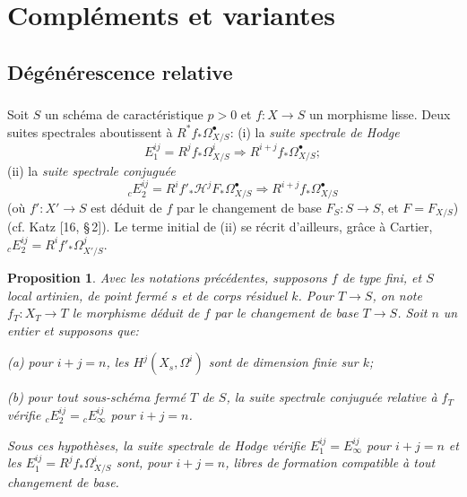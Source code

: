 \documentclass[12pt,a4paper]{article}
\theoremstyle{plain}
\newtheorem{proposition}[theorem]{Proposition}
\theoremstyle{definition}
\theoremstyle{remark}
\begin{document}
\section{Compl\'ements et variantes}

\subsection{D\'eg\'en\'erescence relative}

\subsubsection{}

Soit $S$ un sch\'ema de caract\'eristique $p > 0$ et $f: X \to S$ un morphisme lisse. Deux suites spectrales aboutissent \`a $R^* f_* \Omega^{\bullet}_{X/S}$: (i) la \emph{suite spectrale de Hodge}
\[
E_1^{ij} = R^j f_* \Omega^i_{X/S} \Rightarrow R^{i+j} f_* \Omega^{\bullet}_{X/S};
\]
(ii) la \emph{suite spectrale conjugu\'ee}
\[
{}_c E_2^{ij} = R^i f'_* \mathscr{H}^j F_* \Omega^{\bullet}_{X/S} \Rightarrow R^{i+j} f_* \Omega^{\bullet}_{X/S}
\]
(o\`u $f': X' \to S$ est d\'eduit de $f$ par le changement de base $F_S: S \to S$, et $F = F_{X/S}$) (cf. Katz [16, \S\,2]). Le terme initial de (ii) se r\'ecrit d'ailleurs, gr\^ace \`a Cartier, ${}_c E_2^{ij} = R^i f'_* \Omega^j_{X'/S}$.

\begin{proposition}\label{prop:4.1.2}
Avec les notations pr\'ec\'edentes, supposons $f$ de type fini, et $S$ local artinien, de point ferm\'e $s$ et de corps r\'esiduel $k$. Pour $T \to S$, on note $f_T: X_T \to T$ le morphisme d\'eduit de $f$ par le changement de base $T \to S$. Soit $n$ un entier et supposons que:

\textup{(a)} pour $i + j = n$, les $H^j(X_s, \Omega^i)$ sont de dimension finie sur $k$;

\textup{(b)} pour tout sous-sch\'ema ferm\'e $T$ de $S$, la suite spectrale conjugu\'ee relative \`a $f_T$ v\'erifie ${}_c E_2^{ij} = {}_c E_\infty^{ij}$ pour $i + j = n$.

Sous ces hypoth\`eses, la suite spectrale de Hodge v\'erifie $E_1^{ij} = E_\infty^{ij}$ pour $i + j = n$ et les $E_1^{ij} = R^j f_* \Omega^i_{X/S}$ sont, pour $i + j = n$, libres de formation compatible \`a tout changement de base.
\end{proposition}
\end{document}
